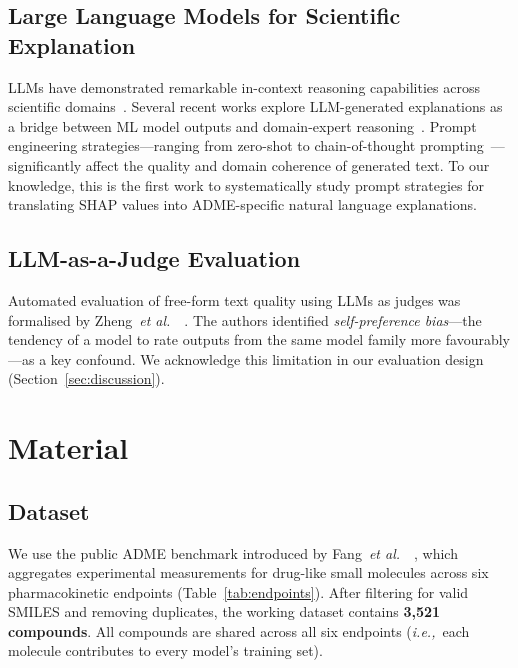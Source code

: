 \documentclass[a4paper, 11pt]{article}
\newcommand{\ie}{\textit{i.e.,}\ }
\newcommand{\etal}{\textit{et al.}\ }
\begin{document}
\subsection{Large Language Models for Scientific Explanation}

LLMs have demonstrated remarkable in-context reasoning capabilities
across scientific domains~\cite{kojima2022large, wei2022chain}.
Several recent works explore LLM-generated explanations as a bridge between
ML model outputs and domain-expert reasoning~\cite{bhatt2020explainable}.
Prompt engineering strategies—ranging from zero-shot to chain-of-thought
prompting~\cite{wei2022chain}—significantly affect the quality and domain
coherence of generated text. To our knowledge, this is the first work to
systematically study prompt strategies for translating SHAP values into
ADME-specific natural language explanations.

\subsection{LLM-as-a-Judge Evaluation}

Automated evaluation of free-form text quality using LLMs as judges was
formalised by Zheng~\etal~\cite{zheng2023judging}. The authors identified
\textit{self-preference bias}—the tendency of a model to rate outputs from
the same model family more favourably—as a key confound. We acknowledge
this limitation in our evaluation design (Section~\ref{sec:discussion}).


\section{Material}
\label{sec:material}

\subsection{Dataset}

We use the public ADME benchmark introduced by Fang~\etal~\cite{fang2023prospective},
which aggregates experimental measurements for drug-like small molecules
across six pharmacokinetic endpoints (Table~\ref{tab:endpoints}).
After filtering for valid SMILES and removing duplicates, the working
dataset contains \textbf{3{,}521 compounds}. All compounds are shared
across all six endpoints (\ie each molecule contributes to every model's
training set).
\end{document}
